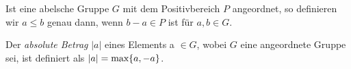 
%

\begin{bem}\label{angeordnetAbelsch} %
Ist eine abelsche Gruppe $G$ mit dem Positivbereich $P$ angeordnet, so definieren wir $a \leq b$ genau dann, wenn $b - a \in P$ ist für $a, b \in G$.
\end{bem}
\begin{defn} \label{betrag}
Der \textit{absolute Betrag} $|a|$ eines Elements a $\in  G$, wobei $G$ eine angeordnete Gruppe sei, ist definiert als $|a| = \textup{max}\lbrace a, -a \rbrace$.
\end{defn}

